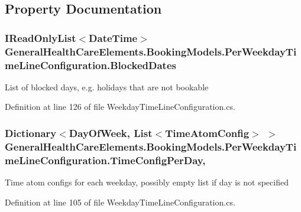 \subsection{Property Documentation}
\subsubsection[{\texorpdfstring{Blocked\+Dates}{BlockedDates}}]{\setlength{\rightskip}{0pt plus 5cm}I\+Read\+Only\+List$<$Date\+Time$>$ General\+Health\+Care\+Elements.\+Booking\+Models.\+Per\+Weekday\+Time\+Line\+Configuration.\+Blocked\+Dates\hspace{0.3cm}{\ttfamily [get]}}\hypertarget{class_general_health_care_elements_1_1_booking_models_1_1_per_weekday_time_line_configuration_adecb01fb7b2ceb94db813389bd5545ff}{}\label{class_general_health_care_elements_1_1_booking_models_1_1_per_weekday_time_line_configuration_adecb01fb7b2ceb94db813389bd5545ff}


List of blocked days, e.\+g. holidays that are not bookable 



Definition at line 126 of file Weekday\+Time\+Line\+Configuration.\+cs.

\subsubsection[{\texorpdfstring{Time\+Config\+Per\+Day}{TimeConfigPerDay}}]{\setlength{\rightskip}{0pt plus 5cm}Dictionary$<$Day\+Of\+Week, List$<${\bf Time\+Atom\+Config}$>$ $>$ General\+Health\+Care\+Elements.\+Booking\+Models.\+Per\+Weekday\+Time\+Line\+Configuration.\+Time\+Config\+Per\+Day\hspace{0.3cm}{\ttfamily [get]}, {\ttfamily [set]}}\hypertarget{class_general_health_care_elements_1_1_booking_models_1_1_per_weekday_time_line_configuration_a3b22c39fd099d2f55e973d4c0d538393}{}\label{class_general_health_care_elements_1_1_booking_models_1_1_per_weekday_time_line_configuration_a3b22c39fd099d2f55e973d4c0d538393}


Time atom configs for each weekday, possibly empty list if day is not specified 



Definition at line 105 of file Weekday\+Time\+Line\+Configuration.\+cs.

